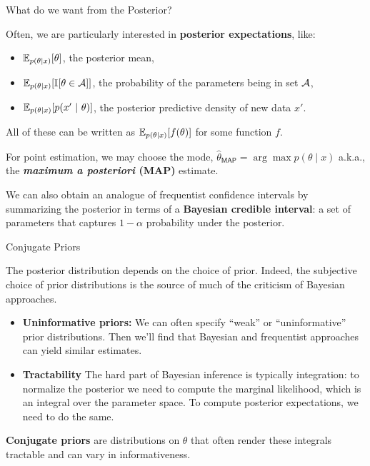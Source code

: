 \documentclass[aspectratio=169]{beamer}
\begin{document}
\begin{frame}[t,allowframebreaks]{What do we want from the
Posterior?}\label{what-do-we-want-from-the-posterior}

Often, we are particularly interested in \textbf{posterior
expectations}, like: 
\begin{itemize}
    \item \(\mathbb{E}_{p(\theta | x)}[\theta]\), the posterior
mean,
    \item \(\mathbb{E}_{p(\theta | x)}[\mathbb{I}[\theta \in \mathcal{A}]]\), the probability of
the parameters being in set \(\mathcal{A}\),
    \item \(\mathbb{E}_{p(\theta | x)}[p(x' ~\vert~ \theta)]\), the posterior predictive
density of new data \(x'\).
\end{itemize}
All of these can be written as \(\mathbb{E}_{p(\theta | x)}[f(\theta)]\) for
some function \(f\).

For point estimation, we may choose the mode,
\(\hat{\theta}_{\mathsf{MAP}} = \arg \max p(\theta \mid x)\) a.k.a., the
\textbf{\emph{maximum a posteriori} (MAP)} estimate.

We can also obtain an analogue of frequentist confidence intervals by
summarizing the posterior in terms of a \textbf{Bayesian credible
interval}: a set of parameters that captures \(1-\alpha\) probability
under the posterior. 

\end{frame}

\begin{frame}[t,allowframebreaks]{Conjugate Priors}\label{conjugate-priors}

The posterior distribution depends on the choice of prior. Indeed, the
subjective choice of prior distributions is the source of much of the
criticism of Bayesian approaches. 

\begin{itemize}
    \item \textbf{Uninformative priors:} We can often specify ``weak'' or
``uninformative'' prior distributions. Then we'll
find that Bayesian and frequentist approaches can yield similar
estimates.

    \item \textbf{Tractability} The hard part of Bayesian inference is
typically integration: to normalize the posterior we need to compute the
marginal likelihood, which is an integral over the parameter space. To
compute posterior expectations, we need to do the same.
\end{itemize}

\textbf{Conjugate priors} are distributions on \(\theta\) that often
render these integrals tractable and can vary in informativeness.
\end{frame}
\end{document}

